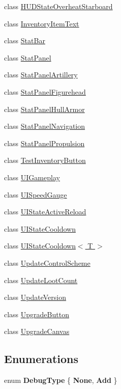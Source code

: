\begin{DoxyCompactItemize}
\item 
class \hyperlink{class_skyrates_1_1_u_i_1_1_h_u_d_state_overheat_starboard}{H\-U\-D\-State\-Overheat\-Starboard}
\item 
class \hyperlink{class_skyrates_1_1_u_i_1_1_inventory_item_text}{Inventory\-Item\-Text}
\item 
class \hyperlink{class_skyrates_1_1_u_i_1_1_stat_bar}{Stat\-Bar}
\item 
class \hyperlink{class_skyrates_1_1_u_i_1_1_stat_panel}{Stat\-Panel}
\item 
class \hyperlink{class_skyrates_1_1_u_i_1_1_stat_panel_artillery}{Stat\-Panel\-Artillery}
\item 
class \hyperlink{class_skyrates_1_1_u_i_1_1_stat_panel_figurehead}{Stat\-Panel\-Figurehead}
\item 
class \hyperlink{class_skyrates_1_1_u_i_1_1_stat_panel_hull_armor}{Stat\-Panel\-Hull\-Armor}
\item 
class \hyperlink{class_skyrates_1_1_u_i_1_1_stat_panel_navigation}{Stat\-Panel\-Navigation}
\item 
class \hyperlink{class_skyrates_1_1_u_i_1_1_stat_panel_propulsion}{Stat\-Panel\-Propulsion}
\item 
class \hyperlink{class_skyrates_1_1_u_i_1_1_test_inventory_button}{Test\-Inventory\-Button}
\item 
class \hyperlink{class_skyrates_1_1_u_i_1_1_u_i_gameplay}{U\-I\-Gameplay}
\item 
class \hyperlink{class_skyrates_1_1_u_i_1_1_u_i_speed_gauge}{U\-I\-Speed\-Gauge}
\item 
class \hyperlink{class_skyrates_1_1_u_i_1_1_u_i_state_active_reload}{U\-I\-State\-Active\-Reload}
\item 
class \hyperlink{class_skyrates_1_1_u_i_1_1_u_i_state_cooldown}{U\-I\-State\-Cooldown}
\item 
class \hyperlink{class_skyrates_1_1_u_i_1_1_u_i_state_cooldown_3_01_t_01_4}{U\-I\-State\-Cooldown$<$ T $>$}
\item 
class \hyperlink{class_skyrates_1_1_u_i_1_1_update_control_scheme}{Update\-Control\-Scheme}
\item 
class \hyperlink{class_skyrates_1_1_u_i_1_1_update_loot_count}{Update\-Loot\-Count}
\item 
class \hyperlink{class_skyrates_1_1_u_i_1_1_update_version}{Update\-Version}
\item 
class \hyperlink{class_skyrates_1_1_u_i_1_1_upgrade_button}{Upgrade\-Button}
\item 
class \hyperlink{class_skyrates_1_1_u_i_1_1_upgrade_canvas}{Upgrade\-Canvas}
\end{DoxyCompactItemize}
\subsection*{Enumerations}
\begin{DoxyCompactItemize}
\item 
enum {\bfseries Debug\-Type} \{ {\bfseries None}, 
{\bfseries Add}
 \}
\end{DoxyCompactItemize}
